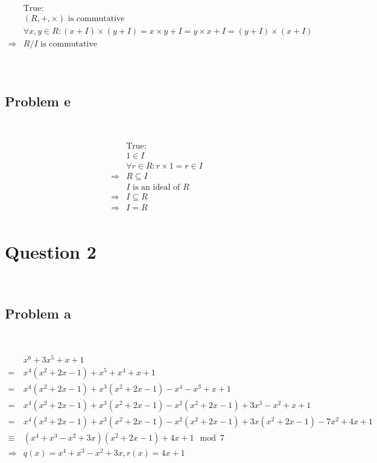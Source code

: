 \documentclass{article}
\begin{document}
~

\begin{align*}
    &\text{True}:\\
    &(R,+,\times )\text{ is commutative}\\
    &\forall x,y\in R:(x+I)\times(y+I)=x\times y +I=y\times x+I=(y+I)\times (x+I)\\
    \Rightarrow&R/I\text{ is commutative}\\
\end{align*}

~

\subsection*{Problem e}

~

\begin{align*}
    &\text{True}:\\
    &1\in I\\
    &\forall r\in R:r\times 1=r\in I\\
    \Rightarrow&R\subseteq I\\
    &I\text{ is an ideal of }R\\
    \Rightarrow&I\subseteq R\\
    \Rightarrow&I=R\\
\end{align*}

\newpage

\section*{Question 2}

~

\subsection*{Problem a}

~

\begin{align*}
    &x^6+3x^5+x+1\\
    =&x^4(x^2+2x-1)+x^5+x^4+x+1\\
    =&x^4(x^2+2x-1)+x^3(x^2+2x-1)-x^4-x^3+x+1\\
    =&x^4(x^2+2x-1)+x^3(x^2+2x-1)-x^2(x^2+2x-1)+3x^3-x^2+x+1\\
    =&x^4(x^2+2x-1)+x^3(x^2+2x-1)-x^2(x^2+2x-1)+3x(x^2+2x-1)-7x^2+4x+1\\
    \equiv&(x^4+x^3-x^2+3x)(x^2+2x-1)+4x+1\mod 7\\
    \Rightarrow&q(x)=x^4+x^3-x^2+3x,r(x)=4x+1\\
\end{align*}
\end{document}
